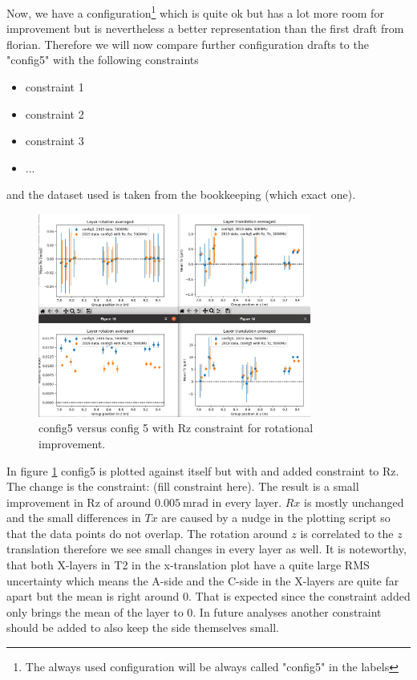 
Now, we have a configuration\footnote{The always used configuration will be
always called "config5" in the labels} which is quite ok but has a lot more room for improvement but is nevertheless a better representation than the first draft from florian.
Therefore we will now compare further configuration drafts to the "config5" with the following constraints
\begin{itemize}
  \item constraint 1
  \item constraint 2
  \item constraint 3
  \item ...
\end{itemize}

and the dataset used is taken from the bookkeeping (which exact one).

\begin{figure}
  \centering
  \includegraphics[width=0.8\textwidth]{plots/august_13/2019_c5_old_vs_withRz_MU.png}
  \caption{config5 versus config 5 with Rz constraint for rotational improvement.}
  \label{fig:withRz}
\end{figure}

In figure \ref{fig:withRz} config5 is plotted against itself but with and added constraint to Rz.
The change is the constraint: (fill constraint here).
The result is a small improvement in Rz of around $\SI{0.005}{\milli\radian}$ in every layer. $Rx$ is mostly unchanged and the small differences in $Tx$ are caused by a nudge in the plotting script so that the data points do not overlap. The rotation around $z$ is correlated to the $z$ translation therefore we see small changes in every layer as well.
It is noteworthy, that both X-layers in T2 in the x-translation plot have a quite large RMS uncertainty which means the A-side and the C-side in the X-layers are quite far apart but the mean is right around 0. That is expected since the constraint added only brings the mean of the layer to 0. In future analyses another constraint should be added to also keep the side themselves small.

